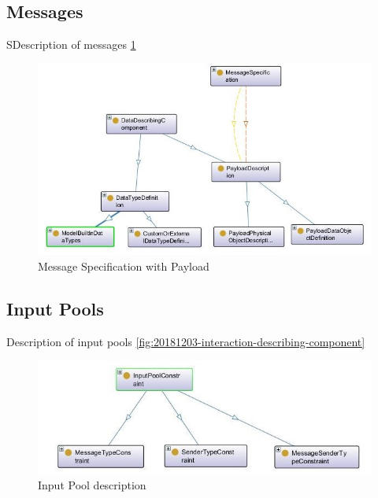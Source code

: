 \newpage

\subsection{Messages}

SDescription of messages \ref{fig:20181205-datatypes-payload}

\begin{figure}[ph]
	\centering
	\includegraphics[width=0.7\linewidth]{20181026-Ontologie-Bilder/Grafiken-Ontologie/SUbject-Interaction/20181205-Datatypes-Payload}
	\caption[Message specification]{Message Specification with Payload}
	\label{fig:20181205-datatypes-payload}
\end{figure}

\newpage

\subsection{Input Pools}

Description of input pools \ref{fig:20181203-interaction-describing-component}

\begin{figure}[ph]
	\centering
	\includegraphics[width=0.7\linewidth]{20181026-Ontologie-Bilder/Grafiken-Ontologie/SUbject-Interaction/input-pool}
	\caption[Input Pool]{Input Pool description}
	\label{fig:input-pool}
\end{figure}



